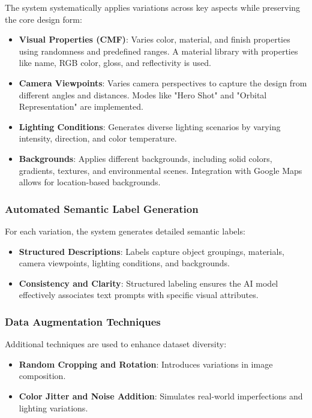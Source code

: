 \documentclass{article}
\begin{document}
The system systematically applies variations across key aspects while preserving the core design form:

\begin{itemize}
    \item \textbf{Visual Properties (CMF)}: Varies color, material, and finish properties using randomness and predefined ranges. A material library with properties like name, RGB color, gloss, and reflectivity is used.
    \item \textbf{Camera Viewpoints}: Varies camera perspectives to capture the design from different angles and distances. Modes like "Hero Shot" and "Orbital Representation" are implemented.
    \item \textbf{Lighting Conditions}: Generates diverse lighting scenarios by varying intensity, direction, and color temperature.
    \item \textbf{Backgrounds}: Applies different backgrounds, including solid colors, gradients, textures, and environmental scenes. Integration with Google Maps allows for location-based backgrounds.
\end{itemize}

\subsubsection{Automated Semantic Label Generation}

For each variation, the system generates detailed semantic labels:

\begin{itemize}
    \item \textbf{Structured Descriptions}: Labels capture object groupings, materials, camera viewpoints, lighting conditions, and backgrounds.
    \item \textbf{Consistency and Clarity}: Structured labeling ensures the AI model effectively associates text prompts with specific visual attributes.
\end{itemize}

\subsubsection{Data Augmentation Techniques}

Additional techniques are used to enhance dataset diversity:

\begin{itemize}
    \item \textbf{Random Cropping and Rotation}: Introduces variations in image composition.
    \item \textbf{Color Jitter and Noise Addition}: Simulates real-world imperfections and lighting variations.
\end{itemize}
\end{document}
